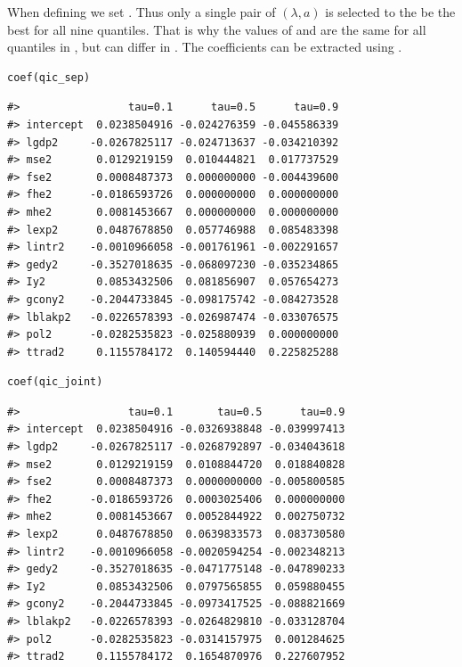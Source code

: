 When defining  we set . Thus only a single pair of \((\lambda,a)\) is selected to the be the best for all nine quantiles. That is why the values of  and  are the same for all quantiles in , but can differ in . The coefficients can be extracted using .

\begin{verbatim}
coef(qic_sep)
\end{verbatim}

\begin{verbatim}
#>                 tau=0.1      tau=0.5      tau=0.9
#> intercept  0.0238504916 -0.024276359 -0.045586339
#> lgdp2     -0.0267825117 -0.024713637 -0.034210392
#> mse2       0.0129219159  0.010444821  0.017737529
#> fse2       0.0008487373  0.000000000 -0.004439600
#> fhe2      -0.0186593726  0.000000000  0.000000000
#> mhe2       0.0081453667  0.000000000  0.000000000
#> lexp2      0.0487678850  0.057746988  0.085483398
#> lintr2    -0.0010966058 -0.001761961 -0.002291657
#> gedy2     -0.3527018635 -0.068097230 -0.035234865
#> Iy2        0.0853432506  0.081856907  0.057654273
#> gcony2    -0.2044733845 -0.098175742 -0.084273528
#> lblakp2   -0.0226578393 -0.026987474 -0.033076575
#> pol2      -0.0282535823 -0.025880939  0.000000000
#> ttrad2     0.1155784172  0.140594440  0.225825288
\end{verbatim}

\begin{verbatim}
coef(qic_joint)
\end{verbatim}

\begin{verbatim}
#>                 tau=0.1       tau=0.5      tau=0.9
#> intercept  0.0238504916 -0.0326938848 -0.039997413
#> lgdp2     -0.0267825117 -0.0268792897 -0.034043618
#> mse2       0.0129219159  0.0108844720  0.018840828
#> fse2       0.0008487373  0.0000000000 -0.005800585
#> fhe2      -0.0186593726  0.0003025406  0.000000000
#> mhe2       0.0081453667  0.0052844922  0.002750732
#> lexp2      0.0487678850  0.0639833573  0.083730580
#> lintr2    -0.0010966058 -0.0020594254 -0.002348213
#> gedy2     -0.3527018635 -0.0471775148 -0.047890233
#> Iy2        0.0853432506  0.0797565855  0.059880455
#> gcony2    -0.2044733845 -0.0973417525 -0.088821669
#> lblakp2   -0.0226578393 -0.0264829810 -0.033128704
#> pol2      -0.0282535823 -0.0314157975  0.001284625
#> ttrad2     0.1155784172  0.1654870976  0.227607952
\end{verbatim}

